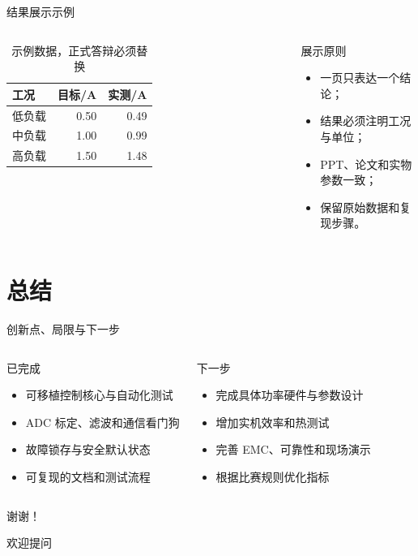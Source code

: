 \documentclass[aspectratio=169,10pt]{beamer}
\begin{document}
\begin{frame}{结果展示示例}
\begin{columns}[T]
\begin{table}
\centering
\begin{tabular}{lrr}
\toprule
工况 & 目标/A & 实测/A\\
\midrule
低负载 & 0.50 & 0.49\\
中负载 & 1.00 & 0.99\\
高负载 & 1.50 & 1.48\\
\bottomrule
\end{tabular}
\caption{示例数据，正式答辩必须替换}
\end{table}
\begin{block}{展示原则}
\begin{itemize}
  \item 一页只表达一个结论；
  \item 结果必须注明工况与单位；
  \item PPT、论文和实物参数一致；
  \item 保留原始数据和复现步骤。
\end{itemize}
\end{block}
\end{columns}
\end{frame}

\section{总结}
\begin{frame}{创新点、局限与下一步}
\begin{columns}[T]
\begin{block}{已完成}
\begin{itemize}
  \item 可移植控制核心与自动化测试
  \item ADC 标定、滤波和通信看门狗
  \item 故障锁存与安全默认状态
  \item 可复现的文档和测试流程
\end{itemize}
\end{block}
\begin{block}{下一步}
\begin{itemize}
  \item 完成具体功率硬件与参数设计
  \item 增加实机效率和热测试
  \item 完善 EMC、可靠性和现场演示
  \item 根据比赛规则优化指标
\end{itemize}
\end{block}
\end{columns}
\end{frame}

\begin{frame}
\centering
{\Huge 谢谢！}\par
\vspace{1cm}
{\Large 欢迎提问}
\end{frame}
\end{document}
